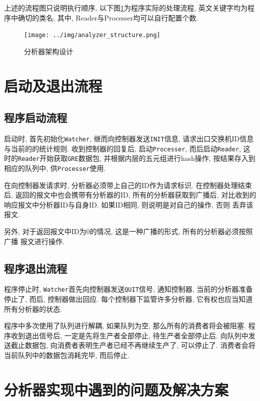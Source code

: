 上述的流程图只说明执行顺序, 以下图\ref{fig:analyzer_arch}为程序实际的处理流程,
英文关键字均为程序中确切的类名. 其中, Reader与Processer均可以自行配置个数.

\begin{figure}
  \centering
  \texttt{[image: ../img/analyzer\_structure.png]}
  \caption{分析器架构设计}
  \label{fig:analyzer_arch}
\end{figure}

\section{启动及退出流程}

\subsection{程序启动流程}
\label{sec:分析器启动过程}

  启动时, 首先初始化\texttt{Watcher}, 继而向控制器发送\texttt{INIT}信息,
请求出口交换机ID信息与当前的的统计规则. 收到控制器的回复后,
启动\texttt{Processer}, 而后启动\texttt{Reader}, 这
时的\texttt{Reader}开始获取\texttt{GRE}数据包, 并根据内层的五元组进行hash操作,
按结果存入到相应的队列中, 供\texttt{Processer}使用.

  在向控制器发请求时, 分析器必须带上自己的ID作为请求标识.
在控制器处理结束后, 返回的报文中也会携带有分析器的ID, 所有的分析器获取到广播后,
对比收到的响应报文中分析器ID与自身ID. 如果ID相同, 则说明是对自己的操作, 否则
丢弃该报文.

  另外, 对于返回报文中ID为0的情况, 这是一种广播的形式, 所有的分析器必须按照广播
报文进行操作.

\subsection{程序退出流程}

程序停止时, \texttt{Watcher}首先向控制器发送\texttt{QUIT}信号,
通知控制器, 当前的分析器准备停止了, 而后, 控制器做出回应.
每个控制器下监管许多分析器, 它有权也应当知道所有分析器的状态.

程序中多次使用了队列进行解耦, 如果队列为空, 那么所有的消费者将会被阻塞.
程序收到退出信号后, 一定是先将生产者全部停止, 待生产者全部停止后.
向队列中发送截止数据包, 向消费者表明生产者已经不再继续生产了,
可以停止了. 消费者会将当前队列中的数据包消耗完毕, 而后停止.

\section{分析器实现中遇到的问题及解决方案}

